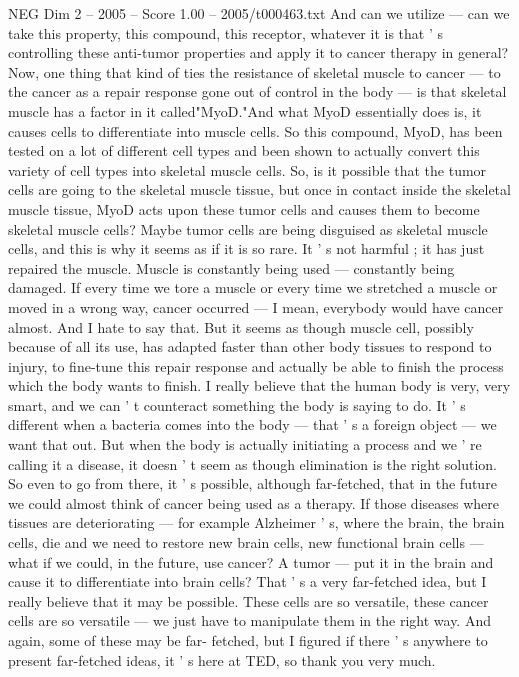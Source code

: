 \begin{textsample}{NEG Dim 2 – 2005 – Score 1.00 – 2005/t000463.txt}
And can we utilize — can we take this property, this compound, this receptor, whatever it is that ' s controlling these anti-tumor properties and apply it to cancer therapy in general?
Now, one thing that kind of ties the resistance of skeletal muscle to cancer — to the cancer as a repair response gone out of control in the body — is that skeletal muscle has a factor in it called"MyoD."And what MyoD essentially does is, it causes cells to differentiate into muscle cells.
So this compound, MyoD, has been tested on a lot of different cell types and been shown to actually convert this variety of cell types into skeletal muscle cells.
So, is it possible that the tumor cells are going to the skeletal muscle tissue, but once in contact inside the skeletal muscle tissue, MyoD acts upon these tumor cells and causes them to become skeletal muscle cells?
Maybe tumor cells are being disguised as skeletal muscle cells, and this is why it seems as if it is so rare.
It ' s not harmful ; it has just repaired the muscle.
Muscle is constantly being used — constantly being damaged.
If every time we tore a muscle or every time we stretched a muscle or moved in a wrong way, cancer occurred — I mean, everybody would have cancer almost.
And I hate to say that.
But it seems as though muscle cell, possibly because of all its use, has adapted faster than other body tissues to respond to injury, to fine-tune this repair response and actually be able to finish the process which the body wants to finish.
I really believe that the human body is very, very smart, and we can ' t counteract something the body is saying to do.
It ' s different when a bacteria comes into the body — that ' s a foreign object — we want that out.
But when the body is actually initiating a process and we ' re calling it a disease, it doesn ' t seem as though elimination is the right solution.
So even to go from there, it ' s possible, although far-fetched, that in the future we could almost think of cancer being used as a therapy.
If those diseases where tissues are deteriorating — for example Alzheimer ' s, where the brain, the brain cells, die and we need to restore new brain cells, new functional brain cells — what if we could, in the future, use cancer?
A tumor — put it in the brain and cause it to differentiate into brain cells?
That ' s a very far-fetched idea, but I really believe that it may be possible.
These cells are so versatile, these cancer cells are so versatile — we just have to manipulate them in the right way.
And again, some of these may be far- fetched, but I figured if there ' s anywhere to present far-fetched ideas, it ' s here at TED, so thank you very much.

\end{textsample}
